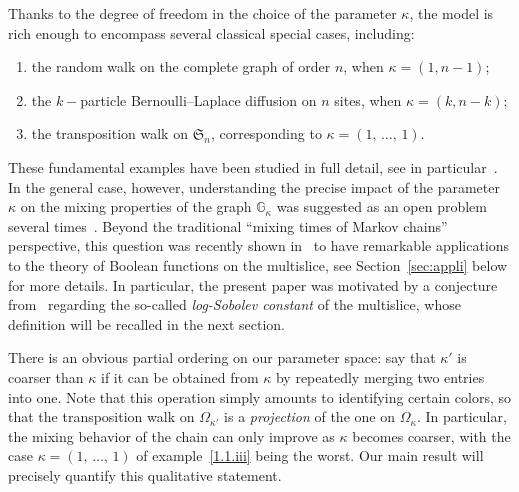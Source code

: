 \documentclass[AHL,Unicode,longabstracts,published]{cedram}
\newcommand{\GG}{\mathbb{G}}
\newcommand{\frkS}{\mathfrak{S}}
\newcommand*{\romanenumi}{\renewcommand*{\theenumi}{\roman{enumi}}}
\begin{document}
Thanks to the degree of freedom in the choice of the parameter $\kappa$, the model is rich enough to encompass several classical special cases, including:
\begin{enumerate}\romanenumi
\item \label{1.1.i} the random walk on the complete graph of order $n$, when $\kappa=(1,n-1)$;
\item \label{1.1.ii}the $k-$particle Bernoulli--Laplace diffusion on $n$ sites, when $\kappa=(k,n-k)$;
\item \label{1.1.iii}the transposition walk on $\frkS_n$, corresponding to $\kappa=(1,\,\ldots,\,1)$.
\end{enumerate}

These fundamental examples have been studied in full detail, see in particular~\cite{MR2240787,MR626813,MR871832,MR2094147,
MR2869447,MR1675008,MR958246,MR1436486,MR2166362,2019arXiv190508514T}. In the general case, however, understanding the precise impact of the parameter $\kappa$ on the mixing properties of the graph $\GG_\kappa$ was suggested as an open problem several times~\cite{MR964069,MR871832,MR3990024}. Beyond the traditional ``mixing times of Markov chains'' perspective, this question was recently shown in~\cite{MR3990024,MR4079633,2018arXiv180903546F} to have remarkable applications to the theory of Boolean functions on the multislice, see Section~\ref{sec:appli} below for more details. In particular, the present paper was motivated by a conjecture from~\cite{2018arXiv180903546F} regarding the so-called \emph{log-Sobolev constant} of the multislice, whose definition will be recalled in the next section.

\begin{rema}[Coarsening]\label{rk:coarsening}
There is an obvious partial ordering on our parameter space: say that $\kappa'$ is coarser than $\kappa$ if it can be obtained from $\kappa$ by repeatedly merging two entries into one. Note that this operation simply amounts to identifying certain colors, so that the transposition walk on $\Omega_{\kappa'}$ is a \emph{projection} of the one on $\Omega_{\kappa}$. In particular, the mixing behavior of the chain can only improve as $\kappa$ becomes coarser, with the case $\kappa=(1,\,\ldots,\,1)$ of example~\eqref{1.1.iii} being the worst. Our main result will precisely quantify this qualitative statement.
\end{rema}
\end{document}
